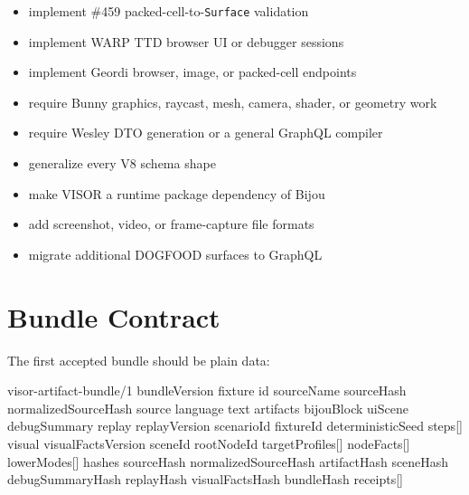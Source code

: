 \begin{itemize}
\tightlist
\item
  implement \#459 packed-cell-to-\texttt{S\allowbreak{}u\allowbreak{}r\allowbreak{}f\allowbreak{}a\allowbreak{}c\allowbreak{}e} validation
\item
  implement WARP TTD browser UI or debugger sessions
\item
  implement Geordi browser, image, or packed-cell endpoints
\item
  require Bunny graphics, raycast, mesh, camera, shader, or geometry work
\item
  require Wesley DTO generation or a general GraphQL compiler
\item
  generalize every V8 schema shape
\item
  make VISOR a runtime package dependency of Bijou
\item
  add screenshot, video, or frame-capture file formats
\item
  migrate additional DOGFOOD surfaces to GraphQL
\end{itemize}

\section{Bundle Contract}\label{record-145-bundle-contract}

The first accepted bundle should be plain data:

\begin{CodeBlock}
visor-artifact-bundle/1
  bundleVersion
  fixture
    id
    sourceName
    sourceHash
    normalizedSourceHash
  source
    language
    text
  artifacts
    bijouBlock
    uiScene
    debugSummary
  replay
    replayVersion
    scenarioId
    fixtureId
    deterministicSeed
    steps[]
  visual
    visualFactsVersion
    sceneId
    rootNodeId
    targetProfiles[]
    nodeFacts[]
    lowerModes[]
  hashes
    sourceHash
    normalizedSourceHash
    artifactHash
    sceneHash
    debugSummaryHash
    replayHash
    visualFactsHash
    bundleHash
  receipts[]
\end{CodeBlock}

